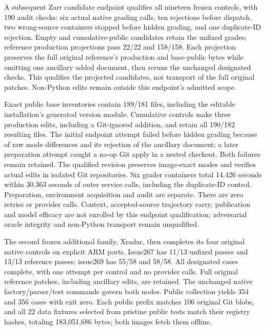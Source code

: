 A subsequent Zarr candidate endpoint qualifies all nineteen frozen controls,
with 190 audit checks: six actual native grading calls, ten rejections before
dispatch, two wrong-source containers stopped before hidden grading, and one
duplicate-ID rejection. Empty and cumulative-public candidates retain the
unfixed grades; reference production projections pass 22/22 and 158/158.
Each projection preserves the full original reference's production and
base-public bytes while omitting one ancillary added document, then reruns
the unchanged designated checks. This qualifies the projected candidates,
not transport of the full original patches. Non-Python edits remain outside
this endpoint's admitted scope.

Exact public base inventories contain 189/181 files, including the editable
installation's generated version module. Cumulative controls make three
production edits, including a Git-ignored addition, and retain all 190/182
resulting files. The initial endpoint attempt failed before hidden grading
because of raw mode differences and its rejection of the ancillary document;
a later preparation attempt caught a no-op Git apply in a nested checkout.
Both failures remain retained. The qualified revision preserves image-exact
modes and verifies actual edits in isolated Git repositories.
Six grader containers total 14.426 seconds within 30.363 seconds of outer
service calls, including the duplicate-ID control. Preparation, environment
acquisition and audit are separate. There are zero retries or provider calls.
Context, accepted-source trajectory carry, publication and model efficacy are
not enrolled by this endpoint qualification; adversarial oracle integrity
and non-Python transport remain unqualified.

The second frozen additional family, Xradar, then completes its four original
native controls on explicit ARM ports. Issue267 has 11/13 unfixed passes and
13/13 reference passes; issue269 has 55/58 and 58/58. All designated cases
complete, with one attempt per control and no provider calls. Full original
reference patches, including ancillary edits, are retained. The unchanged
native factory/parser/test commands govern both nodes. Public collection yields
354 and 356 cases with exit zero. Each public prefix matches 106 original Git
blobs, and all 22 data fixtures selected from pristine public tests match their
registry hashes, totaling 183,051,686 bytes; both images fetch them offline.

